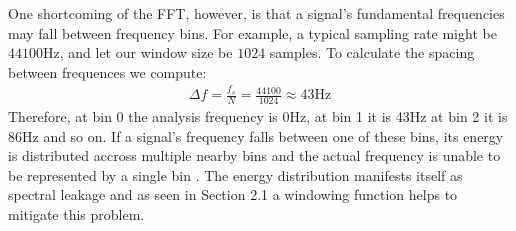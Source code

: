 \documentclass[12pt]{article}
\begin{document}
One shortcoming of the FFT, however, is that a signal's fundamental frequencies may fall between frequency bins. For example, a typical sampling rate might be $44100$Hz, 
and let our window size be $1024$ samples. To calculate the spacing between frequences we compute: 
\begin{align*}
  \Delta f = \frac{f_s}{N} = \frac{44100}{1024} \approx 43 \text{Hz}
\end{align*} 
Therefore, at bin 0 the analysis frequency is 0Hz, at bin 1 it is 43Hz at bin 2 it is 86Hz and so on. If a signal's frequency falls 
between one of these bins, its energy is distributed accross multiple nearby bins and the actual frequency is unable to be represented by a single bin \cite{lim2007phasevocoder}.
The energy distribution manifests itself as spectral leakage and as seen in Section 2.1 a windowing function helps to mitigate this problem. 
\end{document}
